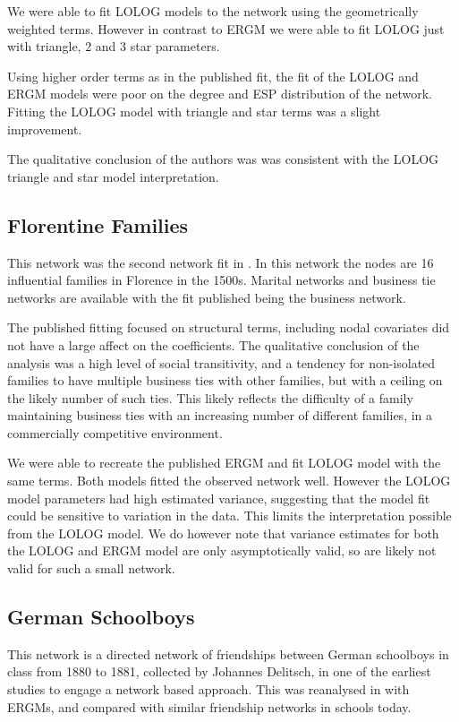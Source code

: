 \documentclass[
]{statsoc}
\begin{document}
We were able to fit LOLOG models to the network using the geometrically
weighted terms. However in contrast to ERGM we were able to fit LOLOG
just with triangle, 2 and 3 star parameters.

Using higher order terms as in the published fit, the fit of the LOLOG
and ERGM models were poor on the degree and ESP distribution of the
network. Fitting the LOLOG model with triangle and star terms was a
slight improvement.

The qualitative conclusion of the authors was was consistent with the
LOLOG triangle and star model interpretation.

\subsection{Florentine Families}

This network was the second network fit in \cite{Robins2007}. In this
network the nodes are 16 influential families in Florence in the 1500s.
Marital networks and business tie networks are available with the fit
published being the business network.

The published fitting focused on structural terms, including nodal
covariates did not have a large affect on the coefficients. The
qualitative conclusion of the analysis was a high level of social
transitivity, and a tendency for non-isolated families to have multiple
business ties with other families, but with a ceiling on the likely
number of such ties. This likely reflects the difficulty of a family
maintaining business ties with an increasing number of different
families, in a commercially competitive environment.

We were able to recreate the published ERGM and fit LOLOG model with the
same terms. Both models fitted the observed network well. However the
LOLOG model parameters had high estimated variance, suggesting that the
model fit could be sensitive to variation in the data. This limits the
interpretation possible from the LOLOG model. We do however note that
variance estimates for both the LOLOG and ERGM model are only
asymptotically valid, so are likely not valid for such a small network.

\subsection{German Schoolboys}

This network is a directed network of friendships between German
schoolboys in class from 1880 to 1881, collected by Johannes Delitsch,
in one of the earliest studies to engage a network based approach. This
was reanalysed in \cite{Heidler2014} with ERGMs, and compared with
similar friendship networks in schools today.
\end{document}
